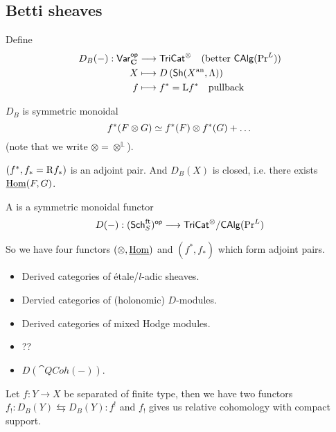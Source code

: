 \subsection{Betti sheaves}
\begin{definition}
Define
\begin{align*}
D_B(-): \mathsf{Var}_{\mathbf{C}}^\mathsf{op} &\longrightarrow \mathsf{TriCat}^{\otimes}\quad (\text{better
}\mathsf{CAlg}(\operatorname{Pr}^L)) \\
X &\longmapsto D\left( \mathsf{Sh}(X^\text{an},\Lambda) \right) \\
f &\longmapsto f^{*} = \mathrm{L} f^{*}\quad \text{pullback}
\end{align*}
\end{definition}
$D_B$ is symmetric monoidal
\[
f^{*}(F\otimes G) \simeq f^{*}(F)\otimes f^{*}(G) + \dots
\]
(note that we write $\otimes = \otimes^{\mathbb{L}}$).
\begin{proposition}
$(f^{*},f_*=\mathrm{R} f_*)$ is an adjoint pair. And $D_B(X)$ is closed, i.e. there exists $\underline{\operatorname{Hom}}(F,G)$.
\end{proposition}
\begin{definition}
A  is a symmetric monoidal functor
\[
D(-):(\Sch_S^{\text{ft}})\op \to \cat{TriCat}^{\otimes} / \cat{CAlg}(\PrL)
\]
\end{definition}
So we have four functors $(\otimes,\underline{\operatorname{Hom}})$ and $(f^{*},f_*)$ which form adjoint pairs.
\begin{example}\leavevmode
\begin{itemize}
\item Derived categories of \'etale/$l$-adic sheaves.
\item Dervied categories of (holonomic) $D$-modules.
\item Derived categories of mixed Hodge modules.
\item ??
\item $D(\cat{QCoh}(-))$.
\end{itemize}
\end{example}
Let $f:Y\to X$ be separated of finite type, then we have two functors
$f_!:D_B(Y)\leftrightarrows D_B(Y):f^{!}$ and $f_!$ gives us relative cohomology with
compact support.

